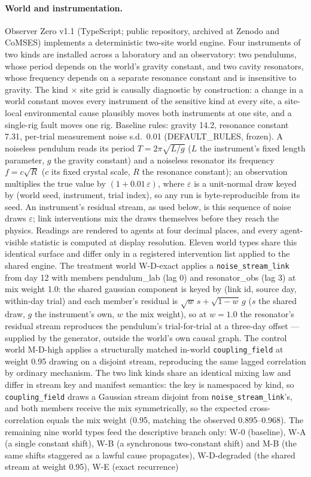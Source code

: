 \documentclass[11pt]{article}
\begin{document}
\paragraph{World and instrumentation.} Observer Zero v1.1 (TypeScript; public repository, archived at Zenodo and CoMSES) implements a deterministic two-site world engine. Four instruments of two kinds are installed across a laboratory and an observatory: two pendulums, whose period depends on the world's gravity constant, and two cavity resonators, whose frequency depends on a separate resonance constant and is insensitive to gravity. The kind $\times$ site grid is causally diagnostic by construction: a change in a world constant moves every instrument of the sensitive kind at every site, a site-local environmental cause plausibly moves both instruments at one site, and a single-rig fault moves one rig. Baseline rules: gravity 14.2, resonance constant 7.31, per-trial measurement noise s.d.\ 0.01 (DEFAULT\_RULES, frozen). A noiseless pendulum reads its period $T = 2\pi\sqrt{L/g}$ ($L$ the instrument's fixed length parameter, $g$ the gravity constant) and a noiseless resonator its frequency $f = c\sqrt{R}$ ($c$ its fixed crystal scale, $R$ the resonance constant); an observation multiplies the true value by $(1 + 0.01\,\varepsilon)$, where $\varepsilon$ is a unit-normal draw keyed by (world seed, instrument, trial index), so any run is byte-reproducible from its seed. An instrument's residual stream, as used below, is this sequence of noise draws $\varepsilon$; link interventions mix the draws themselves before they reach the physics. Readings are rendered to agents at four decimal places, and every agent-visible statistic is computed at display resolution. Eleven world types share this identical surface and differ only in a registered intervention list applied to the shared engine. The treatment world W-D-exact applies a \texttt{noise\_stream\_link} from day 12 with members pendulum\_lab (lag 0) and resonator\_obs (lag 3) at mix weight 1.0: the shared gaussian component is keyed by (link id, source day, within-day trial) and each member's residual is $\sqrt{w}\,s + \sqrt{1-w}\,g$ ($s$ the shared draw, $g$ the instrument's own, $w$ the mix weight), so at $w = 1.0$ the resonator's residual stream reproduces the pendulum's trial-for-trial at a three-day offset --- supplied by the generator, outside the world's own causal graph. The control world M-D-high applies a structurally matched in-world \texttt{coupling\_field} at weight 0.95 drawing on a disjoint stream, reproducing the same lagged correlation by ordinary mechanism. The two link kinds share an identical mixing law and differ in stream key and manifest semantics: the key is namespaced by kind, so \texttt{coupling\_field} draws a Gaussian stream disjoint from \texttt{noise\_stream\_link}'s, and both members receive the mix symmetrically, so the expected cross-correlation equals the mix weight (0.95, matching the observed 0.895--0.968). The remaining nine world types feed the descriptive branch only: W-0 (baseline), W-A (a single constant shift), W-B (a synchronous two-constant shift) and M-B (the same shifts staggered as a lawful cause propagates), W-D-degraded (the shared stream at weight 0.95), W-E (exact recurrence) 
\end{document}
